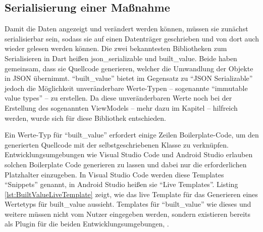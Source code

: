 
\clearpage
\subsection{Serialisierung einer Maßnahme}

Damit die Daten angezeigt und verändert werden können, müssen sie zunächst serialisierbar sein, sodass sie auf einen Datenträger geschrieben und von dort auch wieder gelesen werden können.
Die zwei bekanntesten Bibliotheken zum Serialisieren in Dart heißen json_serializable und built_value.
Beide haben gemeinsam, dass sie Quellcode generieren, welcher die Umwandlung der Objekte in JSON übernimmt.
\enquote{built_value} bietet im Gegensatz zu \enquote{JSON Serializable} jedoch die Möglichkeit unveränderbare Werte-Typen -- sogenannte \enquote{immutable value types} -- zu erstellen.
Da diese unveränderbaren Werte noch bei der Erstellung des sogenannten ViewModels --  mehr dazu im Kapitel  -- hilfreich werden, wurde sich für diese Bibliothek entschieden.

Ein Werte-Typ für \enquote{built_value} erfordert einige Zeilen Boilerplate-Code, um den generierten Quellcode mit der selbstgeschriebenen Klasse zu verknüpfen.
Entwicklungsumgebungen wie Visual Studio Code und Android Studio erlauben solchen Boilerplate Code generieren zu lassen und dabei nur die erforderlichen Platzhalter einzugeben.
In Visual Studio Code werden diese Templates \enquote{Snippets} genannt, in Android Studio heißen sie \enquote{Live Templates}.
 Listing \ref{lst:BuiltValueLiveTemplate} zeigt, wie das live Template für das Generieren eines Wertetyps  für built_value aussieht.
Templates für \enquote{built_value} wie dieses und weitere müssen nicht vom Nutzer eingegeben werden, sondern existieren bereits als Plugin für die beiden Entwicklungsumgebungen, .


